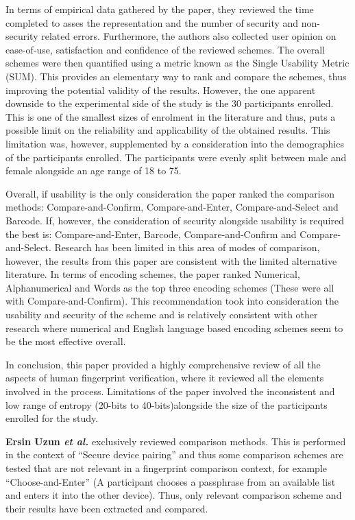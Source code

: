 In terms of empirical data gathered by the paper, they reviewed the time completed to asses the representation and the number of security and non-security related errors. Furthermore, the authors also collected user opinion on ease-of-use, satisfaction and confidence of the reviewed schemes. The overall schemes were then quantified using a metric known as the Single Usability Metric (SUM)\cite{sauro2005method}. This provides an elementary way to rank and compare the schemes, thus improving the potential validity of the results. 
However, the one apparent downside to the experimental side of the study is the 30 participants enrolled. This is one of the smallest sizes of enrolment in the literature and thus, puts a possible limit on the reliability and applicability of the obtained results. This limitation was, however,  supplemented by a consideration into the demographics of the participants enrolled. The participants were evenly split between male and female alongside an age range of 18 to 75.

Overall, if usability is the only consideration the paper ranked the comparison methods: Compare-and-Confirm, Compare-and-Enter, Compare-and-Select and Barcode. If, however, the consideration of security alongside usability is required the best is: Compare-and-Enter, Barcode, Compare-and-Confirm and Compare-and-Select. Research has been limited in this area of modes of comparison, however, the results from this paper are consistent with the limited alternative literature. In terms of encoding schemes, the paper ranked Numerical, Alphanumerical and Words as the top three encoding schemes (These were all with Compare-and-Confirm). This recommendation took into consideration the usability and security of the scheme and is relatively consistent with other research where numerical and English language based encoding schemes seem to be the most effective overall.

In conclusion, this paper provided a highly comprehensive review of all the aspects of human fingerprint verification, where it reviewed all the elements involved in the process. Limitations of the paper involved the inconsistent and low range of entropy (20-bits to 40-bits)alongside the size of the participants enrolled for the study.

\textbf{Ersin Uzun \textit{et al.}}\cite{uzun2007usability} exclusively reviewed comparison methods. This is performed in the context of ``Secure device pairing'' and thus some comparison schemes are tested that are not relevant in a fingerprint comparison context, for example  ``Choose-and-Enter'' (A participant chooses a passphrase from an available list and enters it into the other device). Thus, only relevant comparison scheme and their results have been extracted and compared. 

